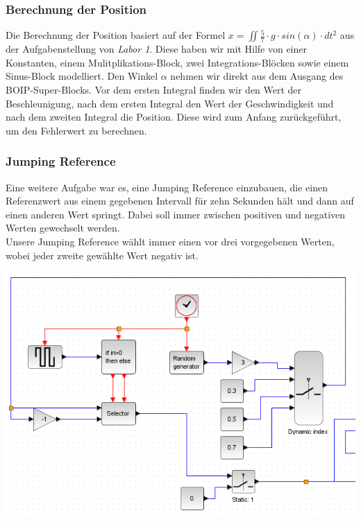 \subsubsection{Berechnung der Position}
Die Berechnung der Position basiert auf der Formel $ x = \iint \frac{5}{7} \cdot g \cdot sin(\alpha) \cdot d t^2 $ aus der Aufgabenstellung von \textit{Labor 1}. Diese haben wir mit Hilfe von einer Konstanten, einem Mulitplikations-Block, zwei Integrations-Blöcken sowie einem Sinus-Block modelliert. Den Winkel $\alpha $ nehmen wir direkt aus dem Ausgang des BOIP-Super-Blocks. Vor dem ersten Integral finden wir den Wert der Beschleunigung, nach dem ersten Integral den Wert der Geschwindigkeit und nach dem zweiten Integral die Position. Diese wird zum Anfang zurückgeführt, um den Fehlerwert zu berechnen.

\subsubsection{Jumping Reference}
Eine weitere Aufgabe war es, eine Jumping Reference einzubauen, die einen Referenzwert aus einem gegebenen Intervall für zehn Sekunden hält und dann auf einen anderen Wert springt. Dabei soll immer zwischen positiven und negativen Werten gewechselt werden. \\
Unsere Jumping Reference wählt immer einen vor drei vorgegebenen Werten, wobei jeder zweite gewählte Wert negativ ist. \\
\begin{center}
	\begin{minipage}{\linewidth}
	\centering
	\includegraphics[scale=0.7]{images/jumping_reference.png}
	\end{minipage}
\end{center}

